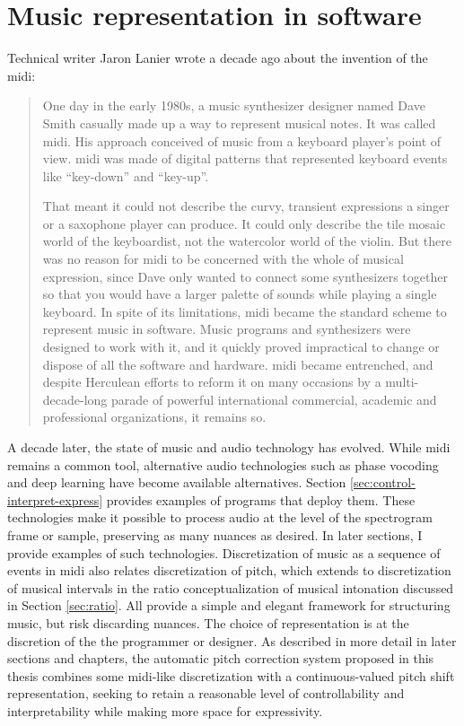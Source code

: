 \section{Music representation in software}
Technical writer Jaron Lanier wrote a decade ago about the invention of the \gls{midi}: \begin{quote}One day in the early 1980s, a music synthesizer designer named Dave Smith casually made up a way to represent musical notes. It was called \gls{midi}. His approach conceived of music from a keyboard player's point of view. \gls{midi} was made of digital patterns that represented keyboard events like ``key-down'' and ``key-up''. 

That meant it could not describe the curvy, transient expressions a singer or a saxophone player can produce. It could only describe the tile mosaic world of the keyboardist, not the watercolor world of the violin. But there was no reason for \gls{midi} to be concerned with the whole of musical expression, since Dave only wanted to connect some synthesizers together so that you would have a larger palette of sounds while playing a single keyboard. In spite of its limitations, \gls{midi} became the standard scheme to represent music in software. Music programs and synthesizers were designed to work with it, and it quickly proved impractical to change or dispose of all the software and hardware. \gls{midi} became entrenched, and despite Herculean efforts to reform it on many occasions by a multi-decade-long parade of powerful international commercial, academic and professional organizations, it remains so. \cite[p.~7]{lanier2010you}\end{quote}

A decade later, the state of music and audio technology has evolved. While \gls{midi} remains a common tool, alternative audio technologies such as phase vocoding and deep learning have become available alternatives. Section \ref{sec:control-interpret-express} provides examples of programs that deploy them. These technologies make it possible to process audio at the level of the spectrogram frame or sample, preserving as many nuances as desired. In later sections, I provide examples of such technologies. Discretization of music as a sequence of events in \gls{midi} also relates discretization of pitch, which extends to discretization of musical intervals in the ratio conceptualization of musical intonation discussed in Section \ref{sec:ratio}. All provide a simple and elegant framework for structuring music, but risk discarding nuances. The choice of representation is at the discretion of the the programmer or designer. As described in more detail in later sections and chapters, the automatic pitch correction system proposed in this thesis combines some \gls{midi}-like discretization with a continuous-valued pitch shift representation, seeking to retain a reasonable level of controllability and interpretability while making more space for expressivity.

